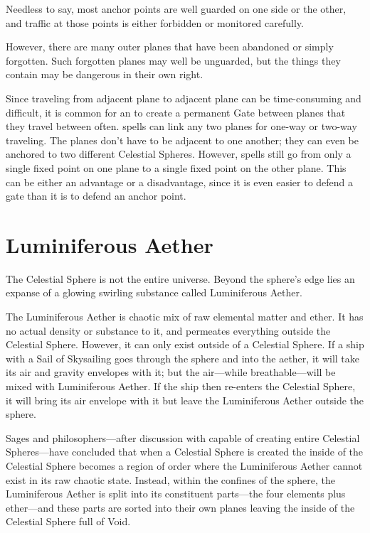 \begin{multicols*}{2}
Needless to say, most anchor points are well guarded on one side or the other, and traffic at those points is either forbidden or monitored carefully.

However, there are many outer planes that have been abandoned or simply forgotten. Such forgotten planes may well be unguarded, but the things they contain may be dangerous in their own right.

Since traveling from adjacent plane to adjacent plane can be time-consuming and difficult, it is common for an  to create a permanent Gate between planes that they travel between often.  spells can link any two planes for one-way or two-way traveling. The planes don’t have to be adjacent to one another; they can even be anchored to two different Celestial Spheres. However,  spells still go from only a single fixed point on one plane to a single fixed point on the other plane. This can be either an advantage or a disadvantage, since it is even easier to defend a gate than it is to defend an anchor point.

\section{Luminiferous Aether}\label{sec:Luminiferous Aether}
The Celestial Sphere is not the entire universe. Beyond the sphere’s edge lies an expanse of a glowing swirling substance called Luminiferous Aether.

The Luminiferous Aether is chaotic mix of raw elemental matter and ether. It has no actual density or substance to it, and permeates everything outside the Celestial Sphere. However, it can only exist outside of a Celestial Sphere. If a ship with a Sail of Skysailing goes through the sphere and into the aether, it will take its air and gravity envelopes with it; but the air—while breathable—will be mixed with Luminiferous Aether. If the ship then re-enters the Celestial Sphere, it will bring its air envelope with it but leave the Luminiferous Aether outside the sphere.

Sages and philosophers—after discussion with  capable of creating entire Celestial Spheres—have concluded that when a Celestial Sphere is created the inside of the Celestial Sphere becomes a region of order where the Luminiferous Aether cannot exist in its raw chaotic state. Instead, within the confines of the sphere, the Luminiferous Aether is split into its constituent parts—the four elements plus ether—and these parts are sorted into their own planes leaving the inside of the Celestial Sphere full of Void.


\end{multicols*}
